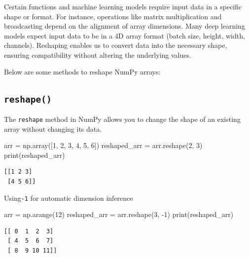 \documentclass[
  letterpaper,
  DIV=11,
  numbers=noendperiod]{scrreprt}
\newenvironment{Shaded}{\begin{snugshade}}{\end{snugshade}}
\newcommand{\BuiltInTok}[1]{\textcolor[rgb]{0.00,0.23,0.31}{#1}}
\newcommand{\DecValTok}[1]{\textcolor[rgb]{0.68,0.00,0.00}{#1}}
\newcommand{\NormalTok}[1]{\textcolor[rgb]{0.00,0.23,0.31}{#1}}
\newcommand{\OperatorTok}[1]{\textcolor[rgb]{0.37,0.37,0.37}{#1}}
\begin{document}
Certain functions and machine learning models require input data in a
specific shape or format. For instance, operations like matrix
multiplication and broadcasting depend on the alignment of array
dimensions. Many deep learning models expect input data to be in a 4D
array format (batch size, height, width, channels). Reshaping enables us
to convert data into the necessary shape, ensuring compatibility without
altering the underlying values.

Below are some methods to reshape NumPy arrays:

\hypertarget{reshape}{%
\subsection{\texorpdfstring{\texttt{reshape()}}{reshape()}}\label{reshape}}

The \texttt{reshape} method in NumPy allows you to change the shape of
an existing array without changing its data.

\begin{Shaded}
\begin{Highlighting}[]
\NormalTok{arr }\OperatorTok{=}\NormalTok{ np.array([}\DecValTok{1}\NormalTok{, }\DecValTok{2}\NormalTok{, }\DecValTok{3}\NormalTok{, }\DecValTok{4}\NormalTok{, }\DecValTok{5}\NormalTok{, }\DecValTok{6}\NormalTok{])}
\NormalTok{reshaped\_arr }\OperatorTok{=}\NormalTok{ arr.reshape(}\DecValTok{2}\NormalTok{, }\DecValTok{3}\NormalTok{)}
\BuiltInTok{print}\NormalTok{(reshaped\_arr)}
\end{Highlighting}
\end{Shaded}

\begin{verbatim}
[[1 2 3]
 [4 5 6]]
\end{verbatim}

Using\texttt{-1} for automatic dimension inference

\begin{Shaded}
\begin{Highlighting}[]
\NormalTok{arr }\OperatorTok{=}\NormalTok{ np.arange(}\DecValTok{12}\NormalTok{)}
\NormalTok{reshaped\_arr }\OperatorTok{=}\NormalTok{ arr.reshape(}\DecValTok{3}\NormalTok{, }\OperatorTok{{-}}\DecValTok{1}\NormalTok{)}
\BuiltInTok{print}\NormalTok{(reshaped\_arr)}
\end{Highlighting}
\end{Shaded}

\begin{verbatim}
[[ 0  1  2  3]
 [ 4  5  6  7]
 [ 8  9 10 11]]
\end{verbatim}
\end{document}
